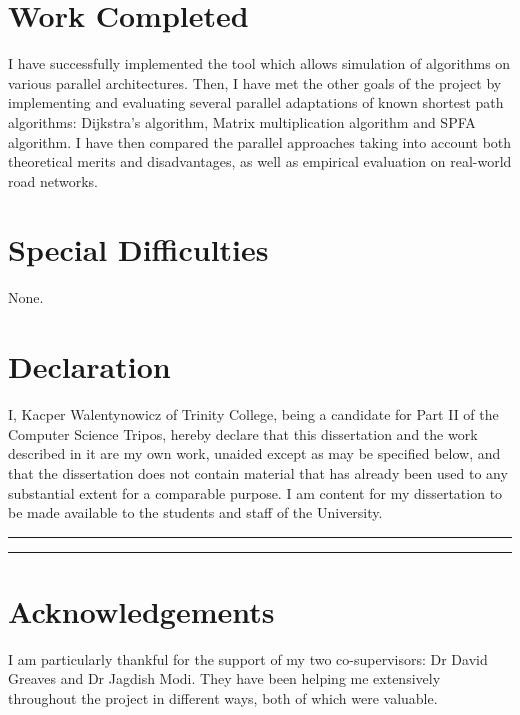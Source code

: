 \documentclass[12pt,a4paper,twoside,openright]{report}
\begin{document}
\section*{Work Completed}

I have successfully implemented the tool which allows simulation of algorithms on various parallel architectures. Then, I have met the other goals of the project by implementing and evaluating several parallel adaptations of known shortest path algorithms: Dijkstra's algorithm, Matrix multiplication algorithm and SPFA algorithm. I have then compared the parallel approaches taking into account both theoretical merits and disadvantages, as well as empirical evaluation on real-world road networks.

\section*{Special Difficulties}

None.
 
\newpage
\section*{Declaration}

I, Kacper Walentynowicz of Trinity College, being a candidate for Part II of the Computer Science Tripos, hereby declare that this dissertation and the work described in it are my own work, unaided except as may be specified below, and that the dissertation does not contain material that has already been used to any substantial
extent for a comparable purpose. I am content for my dissertation to be made available to the students and staff of the University.

\bigskip
{}
\vspace{20pt}
\par\noindent\rule{\textwidth}{0.4pt}

\medskip
{}
\vspace{20pt}
\par\noindent\rule{\textwidth}{0.4pt}

\newpage
\section*{Acknowledgements}

I am particularly thankful for the support of my two co-supervisors: Dr David Greaves and Dr Jagdish Modi. They have been helping me extensively throughout the project in different ways, both of which were valuable.
\end{document}
